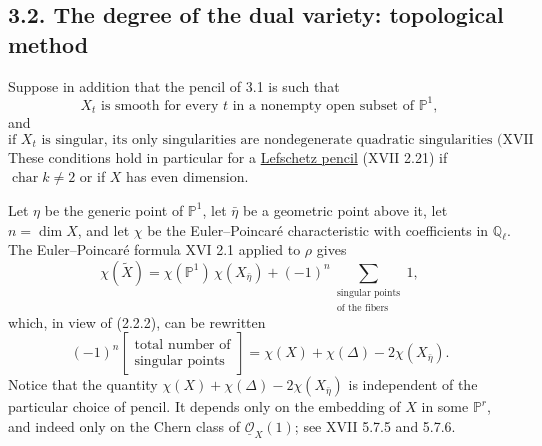 \subsection*{3.2. The degree of the dual variety: topological method}

Suppose in addition that the pencil of 3.1 is such that
\begin{equation}\tag{3.2.1}
X_t\text{ is smooth for every }t\text{ in a nonempty open subset of }
\mathbb P^1,
\end{equation}
and
\begin{equation}\tag{3.2.2}
\text{if $X_t$ is singular, its only singularities are nondegenerate
quadratic singularities (XVII 1.1).}
\end{equation}
These conditions hold in particular for a \underline{Lefschetz pencil}
(XVII 2.21) if $\operatorname{char}k\ne2$ or if $X$ has even dimension.

Let $\eta$ be the generic point of $\mathbb P^1$, let $\bar\eta$ be a
geometric point above it, let $n=\dim X$, and let $\chi$ be the
Euler--Poincar\'e characteristic with coefficients in $\mathbb Q_\ell$.
The Euler--Poincar\'e formula XVI 2.1 applied to $\rho$ gives
\begin{equation}\tag{3.2.3}
\chi(\widetilde X)
=\chi(\mathbb P^1)\,\chi(X_{\bar\eta})
 +(-1)^n\sum_{\substack{\text{singular points}\\
                         \text{of the fibers}}}1,
\end{equation}
which, in view of (2.2.2), can be rewritten
\begin{equation}\tag{3.2.4}
(-1)^n
\left[\begin{array}{c}
\text{total number of}\\[3pt]
\text{singular points}
\end{array}\right]
=\chi(X)+\chi(\Delta)-2\chi(X_{\bar\eta}).
\end{equation}
Notice that the quantity
$\chi(X)+\chi(\Delta)-2\chi(X_{\bar\eta})$ is independent of the particular
choice of pencil.  It depends only on the embedding of $X$ in some
$\mathbb P^r$, and indeed only on the Chern class of
$\underline{\mathcal O}_X(1)$; see XVII 5.7.5 and 5.7.6.


